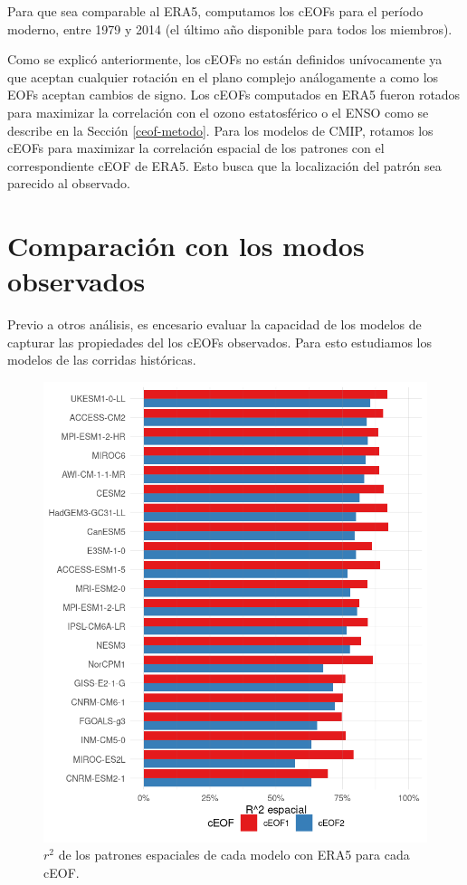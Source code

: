 \documentclass[12pt,oneside,a4paper]{reedthesis}
\begin{document}
Para que sea comparable al ERA5, computamos los cEOFs para el período moderno, entre 1979 y 2014 (el último año disponible para todos los miembros).

Como se explicó anteriormente, los cEOFs no están definidos unívocamente ya que aceptan cualquier rotación en el plano complejo análogamente a como los EOFs aceptan cambios de signo.
Los cEOFs computados en ERA5 fueron rotados para maximizar la correlación con el ozono estatosférico o el ENSO como se describe en la Sección \ref{ceof-metodo}.
Para los modelos de CMIP, rotamos los cEOFs para maximizar la correlación espacial de los patrones con el correspondiente cEOF de ERA5.
Esto busca que la localización del patrón sea parecido al observado.

\hypertarget{comparaciuxf3n-con-los-modos-observados}{%
\section{Comparación con los modos observados}\label{comparaciuxf3n-con-los-modos-observados}}

Previo a otros análisis, es encesario evaluar la capacidad de los modelos de capturar las propiedades del los cEOFs observados.
Para esto estudiamos los modelos de las corridas históricas.



\begin{figure}

{\centering \includegraphics{figures/50-cmip6/comparacion-r2-1} 

}

\caption{\(r^2\) de los patrones espaciales de cada modelo con ERA5 para cada cEOF.}\label{fig:comparacion-r2}
\end{figure}
\end{document}
